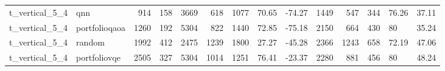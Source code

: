 \begin{longtable}{llrrrrlllrrlll}
t\_vertical\_5\_4 & qnn & 914 & 158 & 3669 & 618 & 1077 & 70.65 & -74.27 & 1449 & 547 & 344 & 76.26 & 37.11 \\
t\_vertical\_5\_4 & portfolioqaoa & 1260 & 192 & 5304 & 822 & 1440 & 72.85 & -75.18 & 2150 & 664 & 430 & 80 & 35.24 \\
t\_vertical\_5\_4 & random & 1992 & 412 & 2475 & 1239 & 1800 & 27.27 & -45.28 & 2366 & 1243 & 658 & 72.19 & 47.06 \\
t\_vertical\_5\_4 & portfoliovqe & 2505 & 327 & 5304 & 1014 & 1251 & 76.41 & -23.37 & 2280 & 881 & 456 & 80 & 48.24 \\
\end{longtable}
